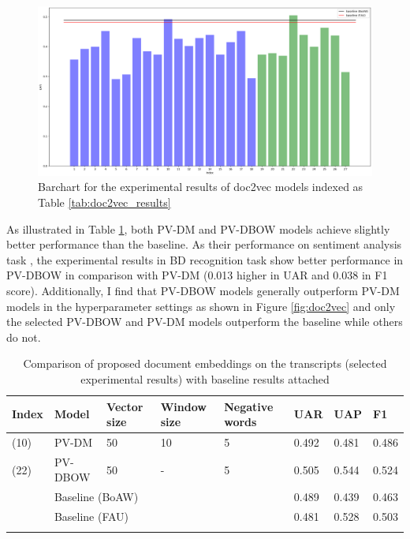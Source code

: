 \begin{figure}[ht]
    \centering
    \includegraphics[width=\textwidth]{images/results/doc2vec.png}
    \caption{Barchart for the experimental results of doc2vec models indexed as Table \ref{tab:doc2vec_results}}
    \label{fig:doc2vec_bar}
\end{figure}

As illustrated in Table \ref{tab:doc2vec_res}, both PV-DM and PV-DBOW models achieve slightly better performance than the baseline. As their performance on sentiment analysis task \cite{lau2016}, the experimental results in BD recognition task show better performance in PV-DBOW in comparison with PV-DM (0.013 higher in UAR and 0.038 in F1 score). 
Additionally, I find that PV-DBOW models generally outperform PV-DM models in the hyperparameter settings as shown in Figure \ref{fig:doc2vec} and only the selected PV-DBOW and PV-DM models outperform the baseline while others do not.


\begin{table}[htb]
    \centering
    \small
    \caption{Comparison of proposed document embeddings on the transcripts (selected experimental results) with baseline results attached}
    \begin{tabular}{l|l|p{1.2cm}|p{1.5cm}|p{1.6cm}|l|l|l}
    \Xhline{2\arrayrulewidth}
        Index & Model & Vector size & Window size & Negative words & UAR & UAP & F1 \\
        \hline
        (10) & PV-DM & 50 & 10 & 5 & 0.492 & 0.481 & 0.486 \\
        \hline
        (22) & PV-DBOW & 50 & - & 5 & 0.505 & 0.544 & 0.524 \\
        \hline
        & \multicolumn{4}{l|}{Baseline (BoAW)} & 0.489 & 0.439 & 0.463 \\
        & \multicolumn{4}{l|}{Baseline (FAU)} & 0.481 & 0.528 & 0.503 \\
    \Xhline{2\arrayrulewidth}
    \end{tabular}
    \label{tab:doc2vec_res}
\end{table}



